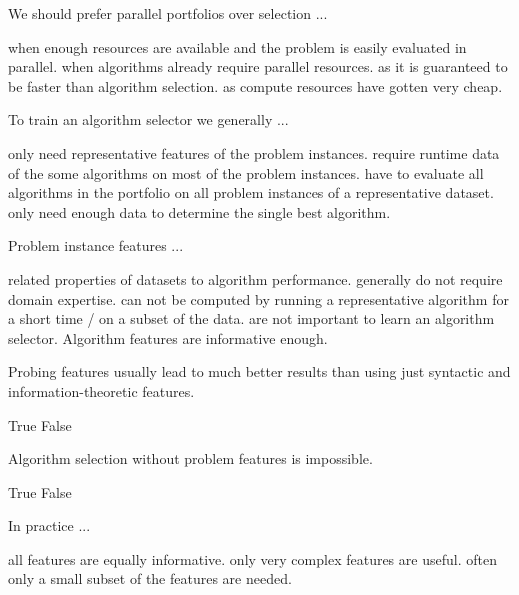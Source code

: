\documentclass{exam}
\begin{document}
\begin{questions}
		\question We should prefer parallel portfolios over selection ...
		\begin{choices}
			\choice when enough resources are available and the problem is easily evaluated in parallel. %
			\choice when algorithms already require parallel resources.
			\choice as it is guaranteed to be faster than algorithm selection.
			\choice as compute resources have gotten very cheap.
		\end{choices}
		
		\question To train an algorithm selector we generally ...
		\begin{choices}
			\choice only need representative features of the problem instances.
			\choice require runtime data of the some algorithms on most of the problem instances.
			\choice have to evaluate all algorithms in the portfolio on all problem instances of a representative dataset. %
			\choice only need enough data to determine the single best algorithm.
		\end{choices}
		
		\question Problem instance features ...
		\begin{choices}
			\choice related properties of datasets to algorithm performance. %
			\choice generally do not require domain expertise.
			\choice can not be computed by running a representative algorithm for a short time / on a subset of the data.
			\choice are not important to learn an algorithm selector. Algorithm features are informative enough.
		\end{choices}
		
		\question Probing features usually lead to much better results than using just syntactic and information-theoretic features.
		\begin{choices}
			\choice True  %
			\choice False
		\end{choices}
		
		\question Algorithm selection without problem features is impossible.
		\begin{choices}
			\choice True
			\choice False %
		\end{choices}
		
		\question In practice ...
		\begin{choices}
			\choice all features are equally informative.
			\choice only very complex features are useful.
			\choice often only a small subset of the features are needed. %
		\end{choices}
		

\end{questions}
\end{document}

